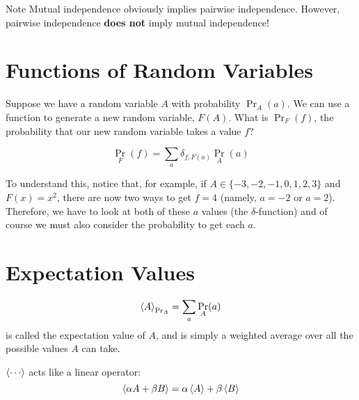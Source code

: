\documentclass[a4paper,twoside,master.tex]{subfiles}
\begin{document}
\begin{note}{Note}
    Mutual independence obviously implies pairwise independence. However, pairwise independence \textbf{does not} imply mutual independence!
\end{note}

\section{Functions of Random Variables}
\label{sec:functions_of_random_variables}

Suppose we have a random variable $ A $ with probability $ \Pr_A(a) $. We can use a function to generate a new random variable, $ F(A) $. What is $ \Pr_F(f) $, the probability that our new random variable takes a value $ f $?

\begin{equation}\label{eq:transformation_theorem_for_probabilities}
    \Pr_F(f) = \sum_a \delta_{f,F(a)} \Pr_A(a)\tag{Transformation Theorem for Probabilities}
\end{equation}

To understand this, notice that, for example, if $ A \in \{-3, -2, -1, 0, 1, 2, 3\} $ and $ F(x) = x^2 $, there are now two ways to get $ f = 4 $ (namely, $ a = -2 $ or $ a = 2 $). Therefore, we have to look at both of these $ a $ values (the $\delta$-function) and of course we must also consider the probability to get each $ a $.

\section{Expectation Values}
\label{sec:expectation_values}

\begin{definition}
    \begin{equation}
        \ev{A}_{\Pr_{A}} = \sum_a \Pr_{A}(a)
    \end{equation}
    is called the expectation value of $ A $, and is simply a weighted average over all the possible values $ A $ can take.
\end{definition}

$ \ev{\cdots} $ acts like a linear operator:
\begin{equation}
    \ev{\alpha A + \beta B} = \alpha \ev{A} + \beta \ev{B}
\end{equation}
\end{document}
